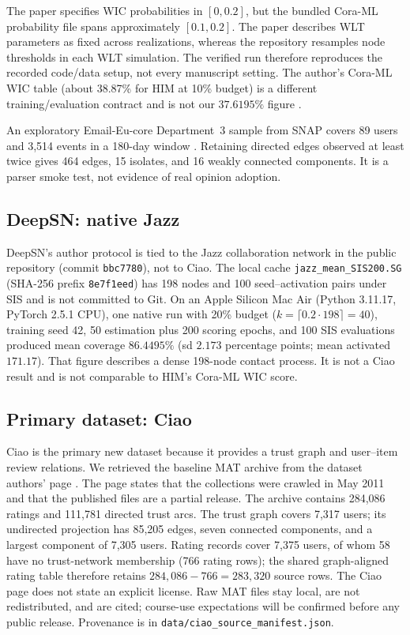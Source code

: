 \documentclass[10pt,twocolumn]{article}
\begin{document}
The paper specifies WIC probabilities in $[0,0.2]$, but the bundled Cora-ML probability file spans approximately $[0.1,0.2]$. The paper describes WLT parameters as fixed across realizations, whereas the repository resamples node thresholds in each WLT simulation. The verified run therefore reproduces the recorded code/data setup, not every manuscript setting. The author's Cora-ML WIC table (about 38.87\% for HIM at 10\% budget) is a different training/evaluation contract and is not our $37.6195\%$ figure \cite{him}.

An exploratory Email-Eu-core Department~3 sample from SNAP covers 89 users and 3,514 events in a 180-day window \cite{snapemail}. Retaining directed edges observed at least twice gives 464 edges, 15 isolates, and 16 weakly connected components. It is a parser smoke test, not evidence of real opinion adoption.

\subsection{DeepSN: native Jazz}
DeepSN's author protocol is tied to the Jazz collaboration network in the public repository (commit \texttt{bbc7780}), not to Ciao. The local cache \texttt{jazz\_mean\_SIS200.SG} (SHA-256 prefix \texttt{8e7f1eed}) has 198 nodes and 100 seed--activation pairs under SIS and is not committed to Git. On an Apple Silicon Mac Air (Python 3.11.17, PyTorch 2.5.1 CPU), one native run with 20\% budget ($k=\lceil 0.2\cdot 198\rceil=40$), training seed 42, 50 estimation plus 200 scoring epochs, and 100 SIS evaluations produced mean coverage $86.4495\%$ (sd $2.173$ percentage points; mean activated $171.17$). That figure describes a dense 198-node contact process. It is not a Ciao result and is not comparable to HIM's Cora-ML WIC score.

\subsection{Primary dataset: Ciao}
Ciao is the primary new dataset because it provides a trust graph and user--item review relations. We retrieved the baseline MAT archive from the dataset authors' page \cite{ciao}. The page states that the collections were crawled in May 2011 and that the published files are a partial release. The archive contains 284,086 ratings and 111,781 directed trust arcs. The trust graph covers 7,317 users; its undirected projection has 85,205 edges, seven connected components, and a largest component of 7,305 users. Rating records cover 7,375 users, of whom 58 have no trust-network membership (766 rating rows); the shared graph-aligned rating table therefore retains $284{,}086-766=283{,}320$ source rows. The Ciao page does not state an explicit license. Raw MAT files stay local, are not redistributed, and are cited; course-use expectations will be confirmed before any public release. Provenance is in \texttt{data/ciao\_source\_manifest.json}.
\end{document}
